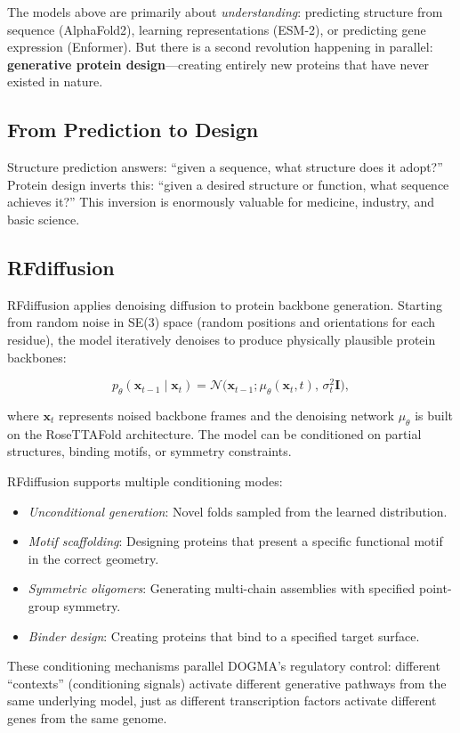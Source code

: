 The models above are primarily about \emph{understanding}: predicting structure from sequence (AlphaFold2), learning representations (ESM-2), or predicting gene expression (Enformer). But there is a second revolution happening in parallel: \textbf{generative protein design}---creating entirely new proteins that have never existed in nature.

\subsection{From Prediction to Design}

Structure prediction answers: ``given a sequence, what structure does it adopt?'' Protein design inverts this: ``given a desired structure or function, what sequence achieves it?'' This inversion is enormously valuable for medicine, industry, and basic science.

\subsection{RFdiffusion}

RFdiffusion \citep{watson2023rfdiffusion} applies denoising diffusion to protein backbone generation. Starting from random noise in SE(3) space (random positions and orientations for each residue), the model iteratively denoises to produce physically plausible protein backbones:

\begin{equation}
p_\theta(\mathbf{x}_{t-1} \mid \mathbf{x}_t) = \mathcal{N}\bigl(\mathbf{x}_{t-1}; \mu_\theta(\mathbf{x}_t, t),\, \sigma_t^2 \mathbf{I}\bigr),
\label{eq:rfdiffusion}
\end{equation}

where $\mathbf{x}_t$ represents noised backbone frames and the denoising network $\mu_\theta$ is built on the RoseTTAFold architecture. The model can be conditioned on partial structures, binding motifs, or symmetry constraints.

\begin{implnote}
RFdiffusion supports multiple conditioning modes:
\begin{itemize}[leftmargin=1.5em]
  \item \emph{Unconditional generation}: Novel folds sampled from the learned distribution.
  \item \emph{Motif scaffolding}: Designing proteins that present a specific functional motif in the correct geometry.
  \item \emph{Symmetric oligomers}: Generating multi-chain assemblies with specified point-group symmetry.
  \item \emph{Binder design}: Creating proteins that bind to a specified target surface.
\end{itemize}
These conditioning mechanisms parallel DOGMA's regulatory control: different ``contexts'' (conditioning signals) activate different generative pathways from the same underlying model, just as different transcription factors activate different genes from the same genome.
\end{implnote}


